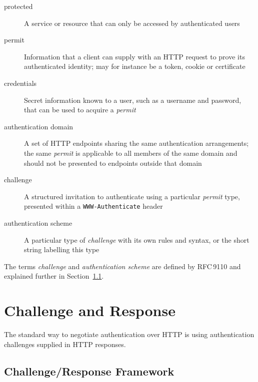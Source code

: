 \documentclass[11pt,a4paper]{ivoa}
\newcommand{\rfc}[1]{RFC\,#1}
\newcommand{\header}[1]{{\tt #1}}
\begin{document}
\begin{description}
\item[protected]
      A service or resource that can only be accessed by authenticated users
\item[permit]
      Information that a client can supply with an HTTP request to
      prove its authenticated identity;
      may for instance be a token, cookie or certificate
\item[credentials]
      Secret information known to a user, such as a username and password,
      that can be used to acquire a {\em permit}
\item[authentication domain]
      A set of HTTP endpoints sharing the same authentication arrangements;
      the same {\em permit\/} is applicable to all members of the same domain
      and should not be presented to endpoints outside that domain
\item[challenge]
      A structured invitation to authenticate using
      a particular {\em permit\/} type,
      presented within a \header{WWW-Authenticate} header
\item[authentication scheme]
      A particular type of {\em challenge\/} with its own rules and syntax,
      or the short string labelling this type
\end{description}
The terms {\em challenge\/} and {\em authentication scheme} are
defined by \rfc{9110} \citep{std:RFC9110}
and explained further in Section~\ref{sec:challenge-response}.


\section{Challenge and Response}

The standard way to negotiate authentication over HTTP is using 
authentication challenges supplied in HTTP responses.

\subsection{Challenge/Response Framework}
\label{sec:challenge-response}
\end{document}

